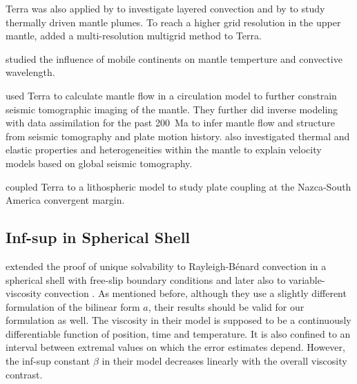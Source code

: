 \documentclass[11pt,a4paper,twoside]{article}    %
\begin{document}
Terra was also applied by \citet{Oldham2004} to investigate layered convection 
and by \citet{Bunge2005,Davies2005a,Davies2005,Davies2009} to study thermally driven mantle plumes.
To reach a higher grid resolution in the upper mantle, \citet{Davies2008} added
a multi-resolution multigrid method to Terra.

\citet{Phillips2005,Phillips2007,Coltice2007,Phillips2009,Phillips2010} studied the influence of mobile continents on mantle temperture and convective wavelength.

\citet{Bunge2001} used Terra to calculate mantle flow in a circulation model
to further constrain seismic tomographic imaging of the mantle. 
They further did inverse modeling with data assimilation for the past 200~Ma \citet{Bunge2002,Bunge2003} 
to infer mantle flow and structure from seismic tomography and plate motion history.
\citet{Schuberth2009,Schuberth2009a} also investigated thermal and elastic properties and heterogeneities within the mantle to explain velocity models based on global seismic tomography.

\citet{Iaffaldano2007} coupled Terra to a lithospheric model to study plate coupling at the Nazca-South America
convergent margin.

\subsection{Inf-sup in Spherical Shell}
\citet{Tabata2000} extended the proof of unique solvability to 
Ray\-leigh-B\'enard convection in a spherical shell with free-slip boundary
conditions and later also to variable-viscosity convection
\citep{Tabata2002,Tabata2006}. 
As mentioned before, although they use a slightly different formulation 
of the bilinear form $a$, their results should be valid for our formulation
as well. The viscosity in their model is supposed to be a continuously
differentiable function 
of position, time and temperature. It is also confined to an interval 
between extremal values on which the error estimates depend. However, 
the inf-sup constant $\beta$ in their model decreases linearly 
with the overall viscosity contrast.



%
%


%
%

\end{document}
